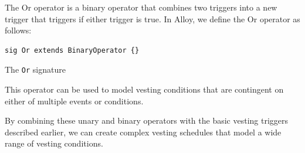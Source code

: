 The Or operator is a binary operator that combines two triggers into a new trigger that triggers if either trigger is true. In Alloy, we define the Or operator as follows:

\begin{listing}[!h]
\begin{verbatim}
sig Or extends BinaryOperator {}
\end{verbatim}
\caption{The \texttt{Or} signature}
\label{lst:or-signature}
\end{listing}


This operator can be used to model vesting conditions that are contingent on either of multiple events or conditions.

By combining these unary and binary operators with the basic vesting triggers described earlier, we can create complex vesting schedules that model a wide range of vesting conditions.

